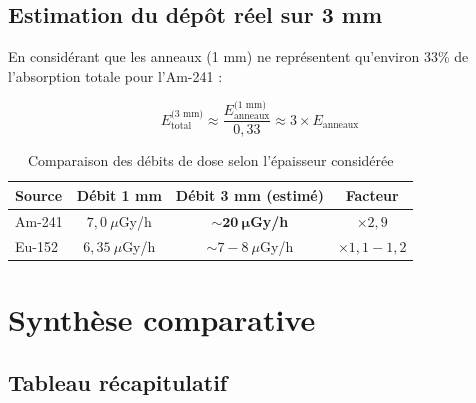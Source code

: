 \documentclass[11pt,a4paper]{article}
\begin{document}
\subsection{Estimation du dépôt réel sur 3 mm}

En considérant que les anneaux (1 mm) ne représentent qu'environ 33\% de l'absorption totale pour l'Am-241 :

\begin{equation}
E_{\text{total}}^{\text{(3 mm)}} \approx \frac{E_{\text{anneaux}}^{\text{(1 mm)}}}{0{,}33} \approx 3 \times E_{\text{anneaux}}
\end{equation}

\begin{table}[h]
\centering
\begin{tabular}{lccc}
\toprule
\rowcolor{headerblue!20}
\textbf{Source} & \textbf{Débit 1 mm} & \textbf{Débit 3 mm (estimé)} & \textbf{Facteur} \\
\midrule
Am-241 & $7{,}0~\mu$Gy/h & $\mathbf{\sim 20~\mu}$\textbf{Gy/h} & $\times 2{,}9$ \\
\rowcolor{lightgray}
Eu-152 & $6{,}35~\mu$Gy/h & $\sim 7{-}8~\mu$Gy/h & $\times 1{,}1{-}1{,}2$ \\
\bottomrule
\end{tabular}
\caption{Comparaison des débits de dose selon l'épaisseur considérée}
\end{table}

\section{Synthèse comparative}

\subsection{Tableau récapitulatif}
\end{document}
